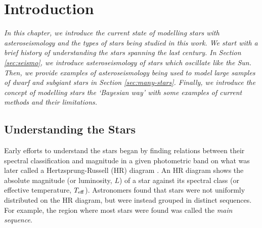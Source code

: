 %
%
%
%
%
\chapter[Introduction]{Introduction}

\textit{In this chapter, we introduce the current state of modelling stars with asteroseismology and the types of stars being studied in this work. We start with a brief history of understanding the stars spanning the last century. In Section \ref{sec:seismo}, we introduce asteroseismology of stars which oscillate like the Sun. Then, we provide examples of asteroseismology being used to model large samples of dwarf and subgiant stars in Section \ref{sec:many-stars}. Finally, we introduce the concept of modelling stars the `Bayesian way' with some examples of current methods and their limitations.}



\section{Understanding the Stars}\label{sec:stars}

Early efforts to understand the stars began by finding relations between their spectral classification and magnitude in a given photometric band on what was later called a Hertzsprung-Russell (HR) diagram \citep[e.g.][]{Russell1914}. An HR diagram shows the absolute magnitude (or luminosity, \(L\)) of a star against its spectral class (or effective temperature, \({T_\mathrm{eff}}\)). Astronomers found that stars were not uniformly distributed on the HR diagram, but were instead grouped in distinct sequences. For example, the region where most stars were found was called the \emph{main sequence}.

